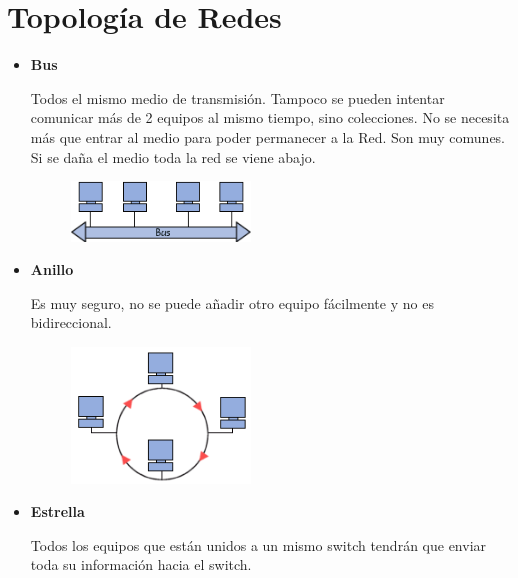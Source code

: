 \documentclass[12pt, fleqn]{report}                             %
\theoremstyle{break}                                            %
\begin{document}
        \section{Topología de Redes}


            \begin{itemize}
                
                \item \textbf{Bus}

                    Todos el mismo medio de transmisión.
                    Tampoco se pueden intentar comunicar más de 2 equipos al mismo tiempo, sino colecciones.
                    No se necesita más que entrar al medio para poder permanecer a la Red.
                    Son muy comunes. Si se daña el medio toda la red se viene abajo.

                    \begin{figure}[h]
                        \centering
                        \includegraphics[width=0.45\textwidth]{Bus}
                    \end{figure}

                \item \textbf{Anillo}

                    Es muy seguro, no se puede añadir otro equipo fácilmente y no es bidireccional.

                    \begin{figure}[h]
                        \centering
                        \includegraphics[width=0.45\textwidth]{Anillo}
                    \end{figure}

                \item \textbf{Estrella}

                    Todos los equipos que están unidos a un mismo switch tendrán que enviar toda su información
                    hacia el switch. 


\end{itemize}
\end{document}

